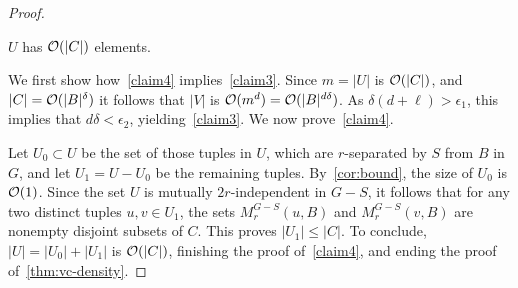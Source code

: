 \begin{proof}
  
  
  \begin{claim}\label{claim4}
	    	 $U$ has  $\mathcal{O}(|C|)$ elements.
  \end{claim}
    We first show how~\cref{claim4} implies~\cref{claim3}.
  Since $m=|U|$ is $\mathcal{O}(|C|)$,
  and $|C|=\mathcal{O}(|B|^\delta)$
  it follows that $|V|$ is $\mathcal{O}(m^d)=\mathcal{O}(|B|^{d\delta})$. As $\delta(d+\ell)>\epsilon_1$, this implies that $d\delta<\epsilon_2$,  yielding~\cref{claim3}.
  We now prove~\cref{claim4}.

\medskip
  Let $U_0\subset U$ be the set of 
  those tuples in $U$, which are $r$-separated by $S$ from $B$ in $G$,
  and let $U_1=U-U_0$ be the remaining  tuples.
  By~\cref{cor:bound}, the size of $U_0$ is $\mathcal{O}(1)$.  
 Since the set $U$ is mutually $2r$-independent in $G-S$, it follows that for any two distinct tuples $u,v\in U_1$,
 the sets $M_r^{G-S}(u,B)$ and $M_r^{G-S}(v,B)$ are nonempty disjoint subsets of $C$. This proves $|U_1|\le |C|$.
%
    To conclude, $|U|=|U_0|+|U_1|$ is $\mathcal{O}(|C|)$, finishing the proof of~\cref{claim4}, and ending the proof of~\cref{thm:vc-density}.  \end{proof}
